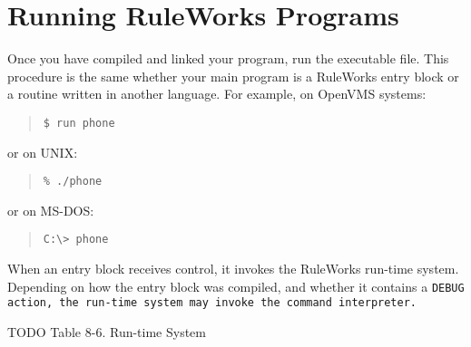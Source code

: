 \section{Running RuleWorks Programs}

Once you have compiled and linked your program, run the executable
file. This procedure is the same whether your main program is a
RuleWorks entry block or a routine written in another language. For
example, on OpenVMS systems:

\begin{quote}
\begin{verbatim}
$ run phone
\end{verbatim}
\end{quote}

or on UNIX:

\begin{quote}
\begin{verbatim}
% ./phone
\end{verbatim}
\end{quote}

or on MS-DOS:
\begin{quote}
\begin{verbatim}
C:\> phone
\end{verbatim}
\end{quote}

When an entry block receives control, it invokes the RuleWorks
run-time system. Depending on how the entry block was compiled, and
whether it contains a \tt{DEBUG} action, the run-time system may
invoke the command interpreter.

TODO
Table 8-6. Run-time System

